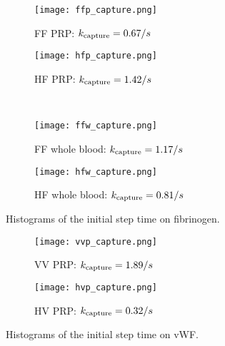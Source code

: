 \documentclass{article}
\newcommand{\tn}{\textnormal}
\begin{document}
\begin{figure}
  \centering
  \begin{subfigure}{0.48\textwidth}
    \texttt{[image: ffp\_capture.png]}
    \caption{FF PRP: $k_\tn{capture} = 0.67 / s$}
  \end{subfigure}
  \hfill
  \begin{subfigure}{0.48\textwidth}
    \texttt{[image: hfp\_capture.png]}
    \caption{HF PRP: $k_\tn{capture} = 1.42 / s$}
  \end{subfigure}
  \\
  \begin{subfigure}{0.48\textwidth}
    \texttt{[image: ffw\_capture.png]}
    \caption{FF whole blood: $k_\tn{capture} = 1.17 / s$}
  \end{subfigure}
  \hfill
  \begin{subfigure}{0.48\textwidth}
    \texttt{[image: hfw\_capture.png]}
    \caption{HF whole blood: $k_\tn{capture} = 0.81 / s$}
  \end{subfigure}
  \caption{Histograms of the initial step time on fibrinogen.}
  \label{fig:fbg-capture}
\end{figure}

\begin{figure}
  \centering
  \begin{subfigure}{0.48\textwidth}
    \texttt{[image: vvp\_capture.png]}
    \caption{VV PRP: $k_\tn{capture} = 1.89 / s$}
  \end{subfigure}
  \hfill
  \begin{subfigure}{0.48\textwidth}
    \texttt{[image: hvp\_capture.png]}
    \caption{HV PRP: $k_\tn{capture} = 0.32 / s$}
  \end{subfigure}
  \caption{Histograms of the initial step time on vWF.}
  \label{fig:vwf-capture}
\end{figure}



\end{document}
